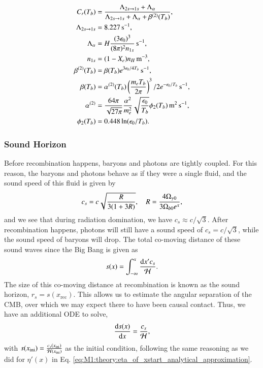 \begin{subequations}
    \begin{align}
        C_r(T_b) &= \frac{\Lambda_{2s\to1s} + \Lambda_\alpha}{\Lambda_{2s\to1s} + \Lambda_\alpha + \beta^{(2)}(T_b)}, \\
        \Lambda_{2s\to1s} &= 8.227\,\mathrm{s^{-1}}, \\
        \Lambda_\alpha &= H \frac{(3\epsilon_0)^3}{(8\pi)^2 n_{1s}}\,\mathrm{s^{-1}}, \\
        n_{1s} &= (1-X_e) n_H \,\mathrm{m^{-3}}, \\
        \beta^{(2)}(T_b) &= \beta(T_b) e^{3\epsilon_0/4T_b} \,\mathrm{s^{-1}},\\
        \beta(T_b) &= \alpha^{(2)}(T_b) \left( \frac{m_e T_b}{2\pi} \right)^3/2 e^{-\epsilon_0/T_b} \,\mathrm{s^{-1}}, \\
        \alpha^{(2)} &= \frac{64\pi}{\sqrt{27\pi}} \frac{\alpha^2}{m_e^2} \sqrt{\frac{\epsilon_0}{T_b}} \phi_2(T_b)\,\mathrm{m^2\,s^{-1}}, \\
        \phi_2(T_b) &= 0.448\ln(\epsilon_0/T_b).
    \end{align}
\end{subequations}
    



\subsubsection{Sound Horizon } \label{sssec:M2:sound_horizon}
Before recombination happens, baryons and photons are tightly coupled. For this reason, the baryons and photons behave as if they were a single fluid, and the sound speed of this fluid is given by 
\begin{equation} \label{eq:M2:theory:soundspeed}
    c_s = c \sqrt{\frac{R}{3(1+3R)}},\quad R = \frac{4\Omega_{\gamma 0}}{3\Omega_{b0} e^x},
\end{equation}
and we see that during radiation domination, we have $c_s \approx c/\sqrt{3}$. After recombination happens, photons will still have a sound speed of $c_s=c/\sqrt{3}$, while the sound speed of baryons will drop.  The total co-moving distance of these sound waves since the Big Bang is given as    
\begin{equation} \label{eq:M2:theory:sound_horizon_integral}
    s(x)=\int_{-\infty}^x \frac{\dd x' c_s}{\mathcal{H}}.
\end{equation}
The size of this co-moving distance at recombination is known as the sound horizon, $r_s = s(x_\mathrm{rec})$. This allows us to estimate the angular separation of the CMB, over which we may expect there to have been causal contact. Thus, we have an additional ODE to solve, 
\begin{equation} \label{eq:M2:theory:sound_horizon_ode}
    \dv{s(x)}{x} = \frac{c_s}{\mathcal{H}},
\end{equation}
with $s(x_\mathrm{ini})=\frac{c_s(x_\mathrm{ini})}{\mathcal{H}(x_\mathrm{ini})}$ as the initial condition, following the same reasoning as we did for $\eta'(x)$ in Eq. \eqref{eq:M1:theory:eta_of_xstart_analytical_approximation}. 
